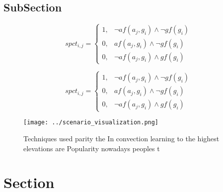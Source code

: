 \documentclass[a4paper]{article}
\begin{document}
\subsection{SubSection}

\begin{equation}
spct_{i,j} =
\begin{cases}
1, & \text{$\neg af(a_j,g_i) \wedge \neg gf(g_i)$}\\
0, & \text{$af(a_j,g_i) \wedge \neg gf(g_i)$}\\
0, & \text{$\neg af(a_j,g_i) \wedge gf(g_i)$}
\end{cases}
\end{equation}

\begin{equation}
spct_{i,j} =
\begin{cases}
1, & \text{$\neg af(a_j,g_i) \wedge \neg gf(g_i)$}\\
0, & \text{$af(a_j,g_i) \wedge \neg gf(g_i)$}\\
0, & \text{$\neg af(a_j,g_i) \wedge gf(g_i)$}
\end{cases}
\end{equation}

\begin{figure}
\centering
\texttt{[image: ../scenario\_visualization.png]}
\caption{Techniques used parity the In convection learning to the highest elevations are Popularity nowadays peoples t
}
\end{figure}
 
\section{Section}
\end{document}
